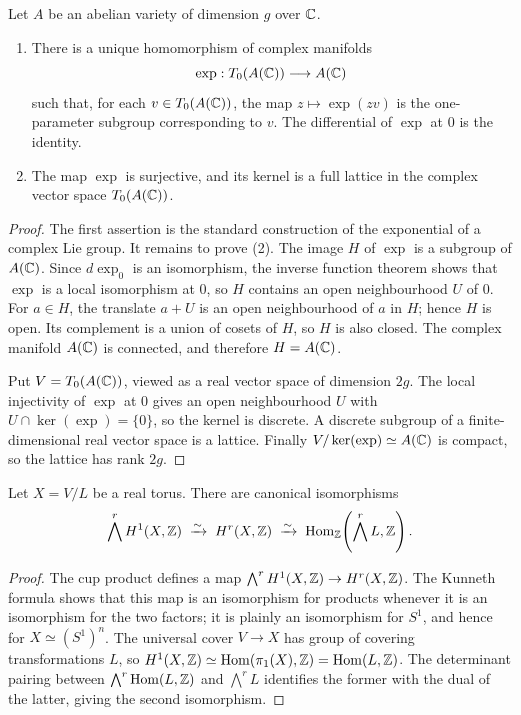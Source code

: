 \begin{proposition}
\label{prop:milne-complex-exponential}

Let $A$ be an abelian variety of dimension $g$ over $\mathbb{C}$.
\begin{enumerate}
\item There is a unique homomorphism of complex manifolds
\[
 \exp:T_0(A(\mathbb{C}))\longrightarrow A(\mathbb{C})
\]
such that, for each $v\in T_0(A(\mathbb{C}))$, the map
$z\mapsto\exp(zv)$ is the one-parameter subgroup corresponding to $v$.
The differential of $\exp$ at $0$ is the identity.
\item The map $\exp$ is surjective, and its kernel is a full lattice in the
complex vector space $T_0(A(\mathbb{C}))$.
\end{enumerate}
\end{proposition}

\begin{proof}
The first assertion is the standard construction of the exponential of a
complex Lie group.  It remains to prove (2).  The image $H$ of $\exp$ is a
subgroup of $A(\mathbb{C})$.  Since $d\exp_0$ is an isomorphism, the inverse function
theorem shows that $\exp$ is a local isomorphism at $0$, so $H$ contains an
open neighbourhood $U$ of $0$.  For $a\in H$, the translate $a+U$ is an open
neighbourhood of $a$ in $H$; hence $H$ is open.  Its complement is a union of
cosets of $H$, so $H$ is also closed.  The complex manifold $A(\mathbb{C})$ is
connected, and therefore $H=A(\mathbb{C})$.

Put $V=T_0(A(\mathbb{C}))$, viewed as a real vector space of dimension $2g$.  The
local injectivity of $\exp$ at $0$ gives an open neighbourhood $U$ with
$U\cap\ker(\exp)=\{0\}$, so the kernel is discrete.  A discrete subgroup of a
finite-dimensional real vector space is a lattice.  Finally
$V/\ker(\exp)\simeq A(\mathbb{C})$ is compact, so the lattice has rank $2g$.
\end{proof}

\begin{theorem}
\label{thm:milne-torus-cohomology}

Let $X=V/L$ be a real torus.  There are canonical isomorphisms
\[
 \bigwedge^r H^1(X,\mathbb{Z})\;\xrightarrow{\sim}\;H^r(X,\mathbb{Z})
 \;\xrightarrow{\sim}\;\operatorname{Hom}_{\mathbb{Z}}\!\left(\bigwedge^r L,\mathbb{Z}\right).
\]
\end{theorem}

\begin{proof}
The cup product defines a map
$\bigwedge^rH^1(X,\mathbb{Z})\to H^r(X,\mathbb{Z})$.  The Kunneth formula shows that this
map is an isomorphism for products whenever it is an isomorphism for the two
factors; it is plainly an isomorphism for $S^1$, and hence for
$X\simeq(S^1)^n$.  The universal cover $V\to X$ has group of covering
transformations $L$, so
$H^1(X,\mathbb{Z})\simeq\operatorname{Hom}(\pi_1(X),\mathbb{Z})=\operatorname{Hom}(L,\mathbb{Z})$.  The determinant pairing
between $\bigwedge^r\operatorname{Hom}(L,\mathbb{Z})$ and $\bigwedge^rL$ identifies the former
with the dual of the latter, giving the second isomorphism.
\end{proof}

